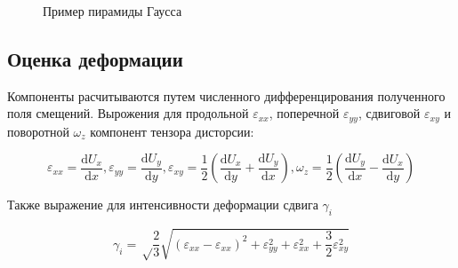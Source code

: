 \begin{figure}[ht]
\caption{Пример пирамиды Гаусса}
\label{pic:pyramid}
\end{figure}

\subsection{Оценка деформации}
Компоненты расчитываются путем численного дифференцирования полученного поля смещений. Вырожения для продольной $\varepsilon_{xx}$, поперечной $\varepsilon_{yy}$, сдвиговой $\varepsilon_{xy}$ и поворотной $\omega_z$ компонент тензора дисторсии:

$$\varepsilon_{xx}= \frac{\mathrm{d} U_x}{\mathrm{d} x},\varepsilon_{yy}= \frac{\mathrm{d} U_y}{\mathrm{d} y},\varepsilon_{xy}=\frac{1}{2}(\frac{\mathrm{d} U_x}{\mathrm{d} y} + \frac{\mathrm{d} U_y}{\mathrm{d} x}),\omega_z=\frac{1}{2}(\frac{\mathrm{d} U_y}{\mathrm{d} x} - \frac{\mathrm{d} U_x}{\mathrm{d} y})$$

Также выражение для интенсивности деформации сдвига $\gamma_i$

$$\gamma_i = \sqrt\frac{2}{3}\sqrt{(\varepsilon_{xx}-\varepsilon_{xx})^2+\varepsilon_{yy}^2+\varepsilon_{xx}^2 + \frac{3}{2}\varepsilon_{xy}^2}$$
